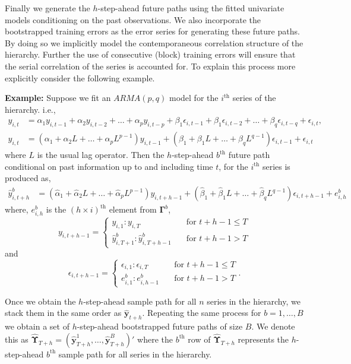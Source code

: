 \documentclass[12pt]{article}
\theoremstyle{definition}
\begin{document}
Finally we generate the $h$-step-ahead future paths using the fitted univariate models conditioning on the past observations. We also incorporate the bootstrapped training errors as the error series for generating these future paths. By doing so we implicitly model the contemporaneous correlation structure of the hierarchy. Further the use of consecutive (block) training errors will ensure that the serial correlation of the series is accounted for. To explain this process more explicitly consider the following example.

\noindent
\textbf{Example:}
Suppose we fit an $ARMA(p,q)$ model for the $i^\text{th}$ series of the hierarchy. i.e.,
\begin{align*}
y_{i,t} &= \alpha_1y_{i,t-1} + \alpha_2y_{i,t-2}+\dots+\alpha_py_{i,t-p} + \beta_1\epsilon_{i,t-1} + \beta_1\epsilon_{i,t-2}+\dots+\beta_q\epsilon_{i,t-q} + \epsilon_{i,t},\\
y_{i,t} &= (\alpha_1 + \alpha_2L+\dots+\alpha_pL^{p-1})y_{i,t-1} + (\beta_1 + \beta_1L+\dots+\beta_qL^{q-1})\epsilon_{i,t-1} + \epsilon_{i,t}
\end{align*}
where $L$ is the usual lag operator. Then the $h$-step-ahead $b^\text{th}$ future path conditional on past information up to and including time $t$, for the $i^\text{th}$ series is produced as,
\begin{align*}
\hat{y}^b_{i,t+h} &= (\hat{\alpha}_1 + \hat{\alpha}_2L +\dots+ \hat{\alpha}_pL^{p-1})y_{i,t+h-1} + (\hat{\beta}_1 + \hat{\beta}_1L+\dots+\hat{\beta}_qL^{q-1})\epsilon_{i,t+h-1} + e^b_{i,h}
\end{align*}
where, $e^b_{i,h}$ is the $(h\times i)^\text{th}$ element from $\bm{\Gamma}^b$,
\begin{equation*}
y_{i,t+h-1} =
\begin{cases}
y_{i,1}:y_{i,T}       & \quad \text{for } t+h-1 \le T\\
\hat{y}^b_{i,T+1}:\hat{y}^b_{i,T+h-1}  & \quad \text{for } t+h-1 > T
\end{cases}
\end{equation*}
and
\begin{equation*}
\epsilon_{i,t+h-1} =
\begin{cases}
\epsilon_{i,1}:\epsilon_{i,T}       & \quad \text{for } t+h-1 \le T\\
e^b_{i,1}:e^b_{i,h-1}  & \quad \text{for } t+h-1 > T
\end{cases}.
\end{equation*}

Once we obtain the $h$-step-ahead sample path for all $n$ series in the hierarchy, we stack them in the same order as $\hat{\bm{y}}_{t+h}$. Repeating the same process for $b = 1,\dots,B$ we obtain a set of $h$-step-ahead bootstrapped future paths of size $B$. We denote this as $\hat{\bm{\Upsilon}}_{T+h} = (\hat{\bm{y}}^1_{T+h},\dots,\hat{\bm{y}}^B_{T+h})'$ where the $b^\text{th}$ row of $\hat{\bm{\Upsilon}}_{T+h}$ represents the $h$-step-ahead $b^\text{th}$ sample path for all series in the hierarchy.
\end{document}
